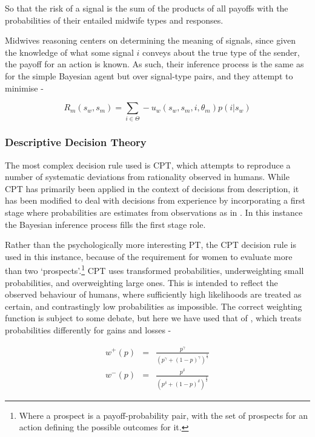 So that the risk of a signal is the sum of the products of all payoffs with the probabilities of their entailed midwife types and responses.

Midwives reasoning centers on determining the meaning of signals, since given the knowledge of what some signal \(i\) conveys about the true type of the sender, the payoff for an action is known. As such, their inference process is the same as for the simple Bayesian agent but over signal-type pairs, and they attempt to minimise -

\begin{equation}
R_{m}(s_{w}, s_{m}) = \sum_{i\in \Theta} -u_{w}(s_{w}, s_{m}, i, \theta_{m})p(i | s_{w})
\end{equation}

\subsubsection{Descriptive Decision Theory}

The most complex decision rule used is \ac{CPT}, which attempts to reproduce a number of systematic deviations from rationality observed in humans. While \ac{CPT} has primarily been applied in the context of decisions from description, it has been modified to deal with decisions from experience by incorporating a first stage where probabilities are estimates from observations as in \cite{FoxCPT}. In this instance the Bayesian inference process fills the first stage role.

Rather than the psychologically more interesting \ac{PT}, the \ac{CPT}
decision rule is used in this instance, because of the requirement
for women to evaluate more than two `prospects'.\footnote{Where a prospect is a payoff-probability pair, with the set of prospects for an action defining the possible outcomes for it.} \ac{CPT} uses transformed probabilities, underweighting
small probabilities, and overweighting large ones. This is intended to reflect the observed behaviour of humans, where sufficiently high likelihoods are treated as certain, and contrastingly low probabilities as impossible. The correct weighting function is subject to some debate, but here we have used that of \citet{Tversky1992}, which treats probabilities differently for gains and losses -

\begin{eqnarray*}
w^{+}(p) & = & \frac{p^{\gamma}}{(p^{\gamma}+(1-p)^{\gamma})^{\frac{1}{\gamma}}}\\
w^{-}(p) & = & \frac{p^{\delta}}{(p^{\delta}+(1-p)^{\delta})^{\frac{1}{\delta}}}
\end{eqnarray*}


